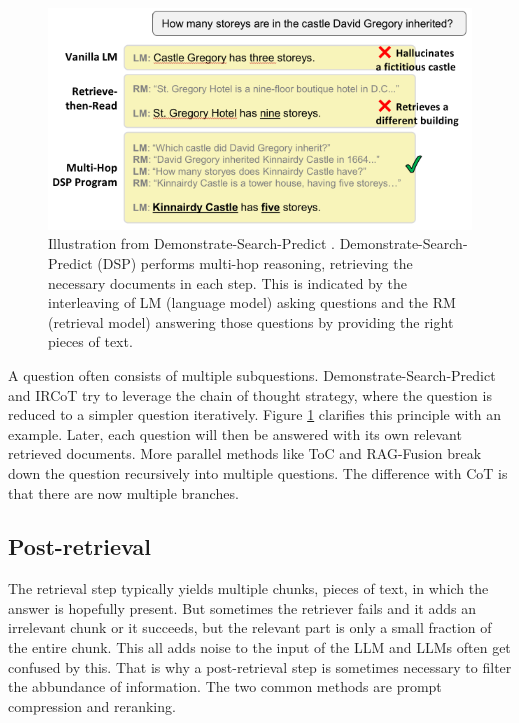 \begin{figure}[h]
	\centering
	\includegraphics[width=0.7\linewidth]{fig/demonstrate_search_predict.png}
	\caption{Illustration from Demonstrate-Search-Predict \cite{khattab2022demonstrate}. Demonstrate-Search-Predict (DSP) performs multi-hop reasoning, retrieving the necessary documents in each step. This is indicated by the interleaving of LM (language model) asking questions and the RM (retrieval model) answering those questions by providing the right pieces of text.}
	\label{fig:demonstrate_search_predict}
\end{figure}

A question often consists of multiple subquestions. Demonstrate-Search-Predict \cite{khattab2022demonstrate} and IRCoT \cite{trivedi2022interleaving} try to leverage the chain of thought strategy, where the question is reduced to a simpler question iteratively. Figure \ref{fig:demonstrate_search_predict} clarifies this principle with an example. Later, each question will then be answered with its own relevant retrieved documents. More parallel methods like ToC \cite{kim2023tree} and RAG-Fusion \cite{rackauckas2024ragfusion} break down the question recursively into multiple questions. The difference with CoT is that there are now multiple branches.

\subsection{Post-retrieval}
The retrieval step typically yields multiple chunks, pieces of text, in which the answer is hopefully present. But sometimes the retriever fails and it adds an irrelevant chunk or it succeeds, but the relevant part is only a small fraction of the entire chunk. This all adds noise to the input of the LLM and LLMs often get confused by this. That is why a post-retrieval step is sometimes necessary to filter the abbundance of information. The two common methods are prompt compression and reranking.
 
